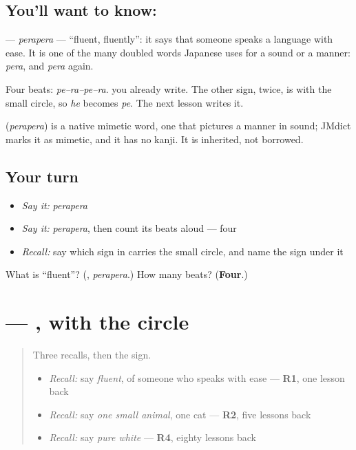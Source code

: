 \subsection*{You'll want to know: }
\textbf{} — \emph{perapera} — \textquotedblleft{}fluent, fluently\textquotedblright{}: it says that someone speaks a language with ease. It is one of the many doubled words Japanese uses for a sound or a manner: \emph{pera}, and \emph{pera} again.

Four beats: \emph{pe–ra–pe–ra}. \textbf{} you already write. The other sign, twice, is \textbf{} with the small circle, so \emph{he} becomes \emph{pe}. The next lesson writes it.

\begin{cousinweb}
\textbf{} (\emph{perapera}) is a native mimetic word, one that pictures a manner in sound; JMdict marks it as mimetic, and it has no kanji. It is inherited, not borrowed.
\end{cousinweb}

\subsection*{Your turn}
\begin{itemize}
\raggedright
  \item \emph{Say it:} \emph{perapera}
  \item \emph{Say it:} \emph{perapera}, then count its beats aloud — four
  \item \emph{Recall:} say which sign in \textbf{} carries the small circle, and name the sign under it
\end{itemize}

\begin{tcolorbox}[breakable,colback=teal!4,colframe=teal!35!black,title={Before you move on}]
What is \textquotedblleft{}fluent\textquotedblright{}? (\textbf{}, \emph{perapera}.) How many beats? (\textbf{Four}.)
\end{tcolorbox}
\section[\texorpdfstring{\ja{ぺ} (pe)}{ぺ (pe)}]{ — , with the circle}

\label{lesson:JA-W137-pe}



\begin{quote}
Three recalls, then the sign.

\begin{itemize}
\raggedright
  \item \emph{Recall:} say \emph{fluent}, of someone who speaks with ease — \textbf{R1}, one lesson back
  \item \emph{Recall:} say \emph{one small animal}, one cat — \textbf{R2}, five lessons back
  \item \emph{Recall:} say \emph{pure white} — \textbf{R4}, eighty lessons back
\end{itemize}
\end{quote}

